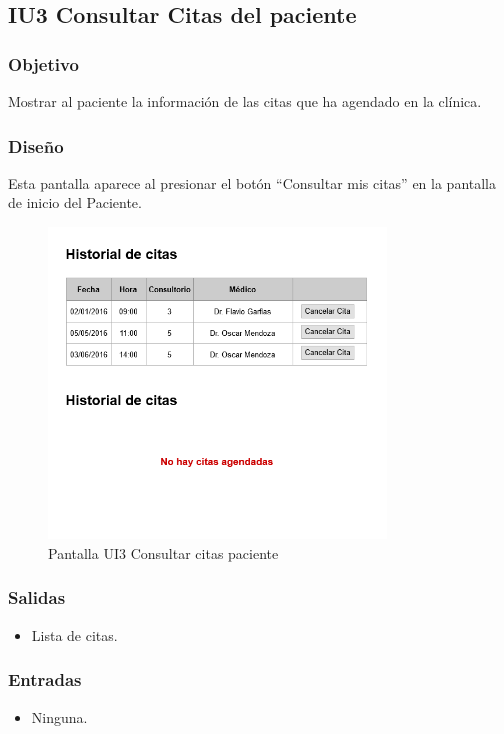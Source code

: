 \subsection{IU3 Consultar Citas del paciente}

\subsubsection{Objetivo}
Mostrar al paciente la información de las citas que ha agendado en la clínica.

\subsubsection{Diseño}
Esta pantalla aparece al presionar el botón ``Consultar mis citas'' en la pantalla de inicio del Paciente.

\begin{figure}[htbp!]
	\centering
	\includegraphics[width=0.8\textwidth]{images/gui/ui3_consultar_citas_paciente}
	\caption{Pantalla UI3 Consultar citas paciente}
\end{figure}

\subsubsection{Salidas}
\begin{itemize}
	\item Lista de citas.
\end{itemize}

\subsubsection{Entradas}
\begin{itemize}
	\item Ninguna. 
\end{itemize}

